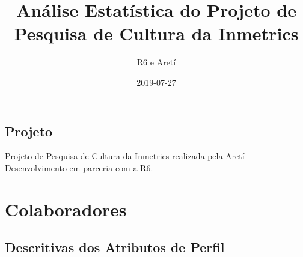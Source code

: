 \documentclass[]{book}
\title{Análise Estatística do Projeto de Pesquisa de Cultura da Inmetrics}
\author{R6 e Aretí}
\date{2019-07-27}
\begin{document}
\maketitle

{
\setcounter{tocdepth}{1}
\tableofcontents
}
\hypertarget{projeto}{%
\chapter{Projeto}\label{projeto}}

Projeto de Pesquisa de Cultura da Inmetrics realizada pela Aretí Desenvolvimento em parceria com a R6.

\hypertarget{part-colaboradores}{%
\part{Colaboradores}\label{part-colaboradores}}

\hypertarget{descritivas-dos-atributos-de-perfil}{%
\chapter{Descritivas dos Atributos de Perfil}\label{descritivas-dos-atributos-de-perfil}}
\end{document}
